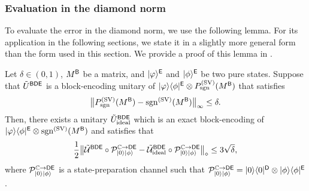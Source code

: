 \subsubsection{Evaluation in the diamond norm}
\label{sec:eval diamond in purif query}



To evaluate the error in the diamond norm, we use the following lemma.
For its application in the following sections, we state it in a slightly more general form than the form used in this section. We provide a proof of this lemma in .

\begin{lemma}
\label{lem:FPAA diamond}
    Let $\delta \in (0, 1)$, $M^{\mathsf{B}}$ be a matrix, and $|\varphi\rangle^{\mathsf{E}}$ and $|\phi\rangle^{\mathsf{E}}$ be two pure states. 
    Suppose that $\tilde{U}^{{\mathsf{B}}{\mathsf{D}}{\mathsf{E}}}$ is a block-encoding unitary of $|\varphi\rangle\langle\phi|^{\mathsf{E}}\otimes P_{\mathrm{sgn}}^{(\rm SV)}(M^{\mathsf{B}})$ that satisfies
\begin{align}
\label{inteq:24}
    \big\|P_{\mathrm{sgn}}^{(\rm SV)}(M^{\mathsf{B}}) - \mathrm{sgn}^{(\rm SV)}(M^{\mathsf{B}})\big\|_\infty \leq \delta.
\end{align}
Then, there exists a unitary $\tilde{U}_{\rm ideal}^{{\mathsf{B}}{\mathsf{D}}{\mathsf{E}}}$ which is an exact block-encoding of $|\varphi\rangle\langle\phi|^{\mathsf{E}} \otimes \mathrm{sgn}^{(\rm SV)}(M^{\mathsf{B}})$ and satisfies that 
\begin{align}
\label{eq:distance of L and L_ideal}
    \frac{1}{2}\big\|\tilde{{\mathcal{U}}}^{{\mathsf{B}}{\mathsf{D}}{\mathsf{E}}} \circ {\mathcal{P}}_{|0\rangle|\phi\rangle}^{\mathbb{C}\rightarrow{\mathsf{D}}{\mathsf{E}}} - \tilde{{\mathcal{U}}}_{\rm ideal}^{{\mathsf{B}}{\mathsf{D}}{\mathsf{E}}} \circ {\mathcal{P}}_{|0\rangle|\phi\rangle}^{\mathbb{C}\rightarrow{\mathsf{D}}{\mathsf{E}}}\big\|_\diamond \leq 3\sqrt{\delta},
\end{align}
where ${\mathcal{P}}_{|0\rangle|\phi\rangle}^{\mathbb{C}\rightarrow{\mathsf{D}}{\mathsf{E}}}$ is a state-preparation channel such that ${\mathcal{P}}_{|0\rangle|\phi\rangle}^{\mathbb{C}\rightarrow{\mathsf{D}}{\mathsf{E}}} = |0\rangle\langle0|^{{\mathsf{D}}}\otimes|\phi\rangle\langle\phi|^{\mathsf{E}}$.
\end{lemma}






